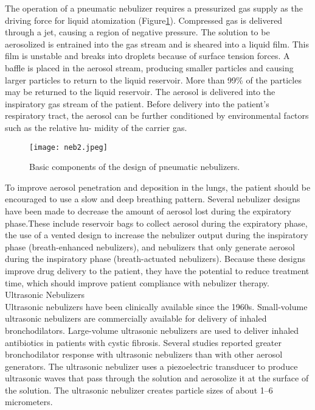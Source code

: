 \documentclass[12pt]{article}
\begin{document}
The operation of a pneumatic nebulizer requires a pressurized gas supply as the driving force for liquid atomization (Figure\ref{fig_neb2}). Compressed gas is delivered through a jet, causing a region of negative pressure. The solution to be aerosolized is entrained into the gas stream and is sheared into a liquid film. This film is unstable and breaks into droplets because of surface tension forces. A baffle is placed in the aerosol stream, producing smaller particles and causing larger particles to return to the liquid reservoir. More than 99\% of the particles may be returned to the liquid reservoir. The aerosol is delivered into the inspiratory gas stream of the patient. Before delivery into the patient’s respiratory tract, the aerosol can be further conditioned by environmental factors such as the relative hu- midity of the carrier gas.\\

\begin{figure}[h] 
\centering 
\texttt{[image: neb2.jpeg]} 
\caption{Basic components of the design of pneumatic nebulizers.} 
\label{fig_neb2}
\end{figure}

To improve aerosol penetration and deposition in the lungs, the patient should be encouraged to use a slow and deep breathing pattern. Several nebulizer designs have been made to decrease the amount of aerosol lost during the expiratory phase.These include reservoir bags to collect aerosol during the expiratory phase, the use of a vented design to increase the nebulizer output during the inspiratory phase (breath-enhanced nebulizers), and nebulizers that only generate aerosol during the inspiratory phase (breath-actuated nebulizers). Because these designs improve drug delivery to the patient, they have the potential to reduce treatment time, which should improve patient compliance with nebulizer therapy.\\

Ultrasonic Nebulizers\\

Ultrasonic nebulizers have been clinically available since the 1960s. Small-volume ultrasonic nebulizers are commercially available for delivery of inhaled bronchodilators. Large-volume ultrasonic nebulizers are used to deliver inhaled antibiotics in patients with cystic fibrosis. Several studies reported greater bronchodilator response with ultrasonic nebulizers than with other aerosol generators. The ultrasonic nebulizer uses a piezoelectric transducer to produce ultrasonic waves that pass through the solution and aerosolize it at the surface of the solution. The ultrasonic nebulizer creates particle sizes of about 1–6 micrometers.\\
\end{document}
